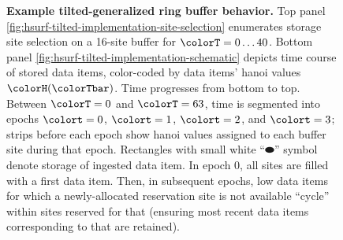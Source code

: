 \begin{figure}[htbp!]

\vspace{-2ex}\caption{%
  \textbf{Example tilted-generalized ring buffer behavior.}
  \footnotesize
  Top panel \ref{fig:hsurf-tilted-implementation-site-selection} enumerates storage site selection on a 16-site buffer for $\colorT=0 \ldots 40$.
  Bottom panel \ref{fig:hsurf-tilted-implementation-schematic} depicts time course of stored data items, color-coded by data items' hanoi values $\colorH(\colorTbar)$.
  Time progresses from bottom to top.
  Between $\colorT=0$ and $\colorT=63$, time is segmented into epochs $\colort=0$, $\colort=1$, $\colort=2$, and $\colort=3$; strips before each epoch show hanoi values assigned to each buffer site during that epoch.
  Rectangles with small white ``$\blkhorzoval$'' symbol denote storage of ingested data item.
  In epoch 0, all sites are filled with a first data item.
  Then, in subsequent epochs, low \hv{} data items for which a newly-allocated reservation site is not available ``cycle'' within sites reserved for that \hv{} (ensuring most recent data items corresponding to that \hv{} are retained).
}
\label{fig:hsurf-tilted-implementation}

\end{figure}
